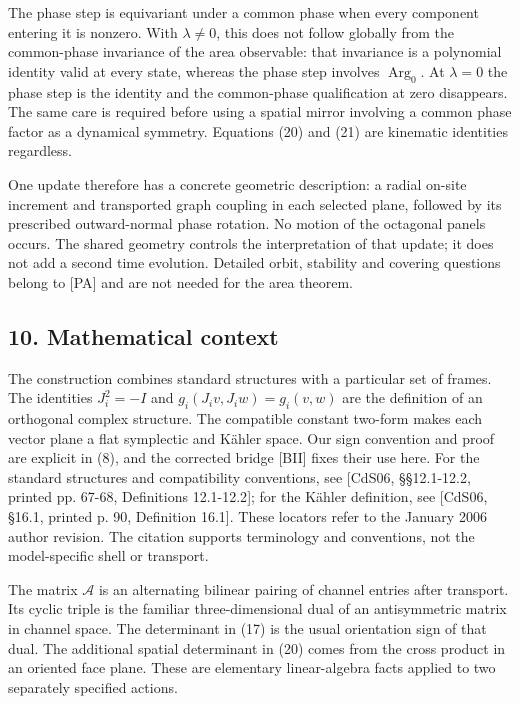 \documentclass[
  11pt,
  a4paper,
]{article}
\begin{document}
The phase step is equivariant under a common phase when every component entering it is nonzero. With \(\lambda\ne0\), this does not follow globally from the common-phase invariance of the area observable: that invariance is a polynomial identity valid at every state, whereas the phase step involves \(\operatorname{Arg}_0\). At \(\lambda=0\) the phase step is the identity and the common-phase qualification at zero disappears. The same care is required before using a spatial mirror involving a common phase factor as a dynamical symmetry. Equations (20) and (21) are kinematic identities regardless.

One update therefore has a concrete geometric description: a radial on-site increment and transported graph coupling in each selected plane, followed by its prescribed outward-normal phase rotation. No motion of the octagonal panels occurs. The shared geometry controls the interpretation of that update; it does not add a second time evolution. Detailed orbit, stability and covering questions belong to {[}PA{]} and are not needed for the area theorem.

\subsection{10. Mathematical context}\label{mathematical-context}

The construction combines standard structures with a particular set of frames. The identities \(J_i^2=-I\) and \(g_i(J_iv,J_iw)=g_i(v,w)\) are the definition of an orthogonal complex structure. The compatible constant two-form makes each vector plane a flat symplectic and Kähler space. Our sign convention and proof are explicit in (8), and the corrected bridge {[}BII{]} fixes their use here. For the standard structures and compatibility conventions, see {[}CdS06, §§12.1-12.2, printed pp. 67-68, Definitions 12.1-12.2{]}; for the Kähler definition, see {[}CdS06, §16.1, printed p. 90, Definition 16.1{]}. These locators refer to the January 2006 author revision. The citation supports terminology and conventions, not the model-specific shell or transport.

The matrix \(\mathcal A\) is an alternating bilinear pairing of channel entries after transport. Its cyclic triple is the familiar three-dimensional dual of an antisymmetric matrix in channel space. The determinant in (17) is the usual orientation sign of that dual. The additional spatial determinant in (20) comes from the cross product in an oriented face plane. These are elementary linear-algebra facts applied to two separately specified actions.
\end{document}
